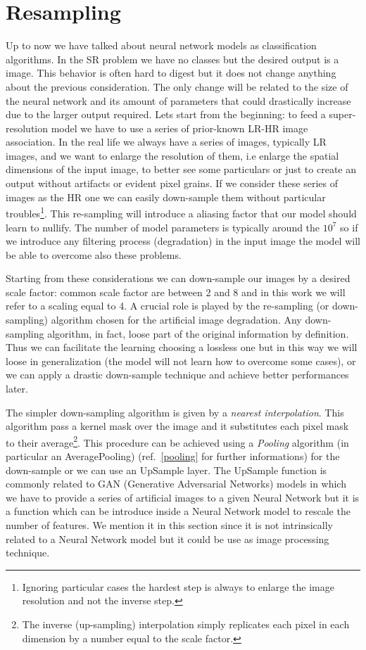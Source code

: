 \documentclass{standalone}
\begin{document}
\section[Resampling]{Resampling}\label{downsampling}

Up to now we have talked about neural network models as classification algorithms.
In the SR problem we have no classes but the desired output is a image.
This behavior is often hard to digest but it does not change anything about the previous consideration.
The only change will be related to the size of the neural network and its amount of parameters that could drastically increase due to the larger output required.
Lets start from the beginning: to feed a super-resolution model we have to use a series of prior-known LR-HR image association.
In the real life we always have a series of images, typically LR images, and we want to enlarge the resolution of them, i.e enlarge the spatial dimensions of the input image, to better see some particulars or just to create an output without artifacts or evident pixel grains.
If we consider these series of images as the HR one we can easily down-sample them without particular troubles\footnote{
  Ignoring particular cases the hardest step is always to enlarge the image resolution and not the inverse step.
}.
This re-sampling will introduce a aliasing factor that our model should learn to nullify.
The number of model parameters is typically around the $10^7$ so if we introduce any filtering process (degradation) in the input image the model will be able to overcome also these problems.

Starting from these considerations we can down-sample our images by a desired scale factor: common scale factor are between 2 and 8 and in this work we will refer to a scaling equal to 4.
A crucial role is played by the re-sampling (or down-sampling) algorithm chosen for the artificial image degradation.
Any down-sampling algorithm, in fact, loose part of the original information by definition.
Thus we can facilitate the learning choosing a lossless one but in this way we will loose in generalization (the model will not learn how to overcome some cases), or we can apply a drastic down-sample technique and achieve better performances later.

The simpler down-sampling algorithm is given by a \emph{nearest interpolation}.
This algorithm pass a kernel mask over the image and it substitutes each pixel mask to their average\footnote{
  The inverse (up-sampling) interpolation simply replicates each pixel in each dimension by a number equal to the scale factor.
}.
This procedure can be achieved using a \emph{Pooling} algorithm (in particular an AveragePooling) (ref.~\ref{pooling} for further informations) for the down-sample or we can use an UpSample layer.
The UpSample function is commonly related to GAN (Generative Adversarial Networks) models in which we have to provide a series of artificial images to a given Neural Network but it is a function which can be introduce inside a Neural Network model to rescale the number of features.
We mention it in this section since it is not intrinsically related to a Neural Network model but it could be use as image processing technique.
\end{document}
